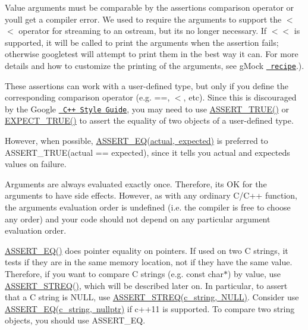 Value arguments must be comparable by the assertion\textquotesingle{}s comparison operator or you\textquotesingle{}ll get a compiler error. We used to require the arguments to support the {\ttfamily $<$$<$} operator for streaming to an {\ttfamily ostream}, but it\textquotesingle{}s no longer necessary. If {\ttfamily $<$$<$} is supported, it will be called to print the arguments when the assertion fails; otherwise googletest will attempt to print them in the best way it can. For more details and how to customize the printing of the arguments, see g\+Mock \href{../../googlemock/docs/CookBook.md\#teaching-google-mock-how-to-print-your-values}{\texttt{ recipe}}.).

These assertions can work with a user-\/defined type, but only if you define the corresponding comparison operator (e.\+g. {\ttfamily ==}, {\ttfamily $<$}, etc). Since this is discouraged by the Google \href{https://google.github.io/styleguide/cppguide.html\#Operator_Overloading}{\texttt{ C++ Style Guide}}, you may need to use {\ttfamily \mbox{\hyperlink{gtest_8h_ae9244bfbda562e8b798789b001993fa5}{A\+S\+S\+E\+R\+T\+\_\+\+T\+R\+U\+E()}}} or {\ttfamily \mbox{\hyperlink{gtest_8h_ac33e7cdfb5d44a7a0f0ab552eb5c3c6a}{E\+X\+P\+E\+C\+T\+\_\+\+T\+R\+U\+E()}}} to assert the equality of two objects of a user-\/defined type.

However, when possible, {\ttfamily \mbox{\hyperlink{gtest_8h_a1a6db8b1338ee7040329322b77779086}{A\+S\+S\+E\+R\+T\+\_\+\+E\+Q(actual, expected)}}} is preferred to {\ttfamily A\+S\+S\+E\+R\+T\+\_\+\+T\+R\+UE(actual == expected)}, since it tells you {\ttfamily actual} and {\ttfamily expected}\textquotesingle{}s values on failure.

Arguments are always evaluated exactly once. Therefore, it\textquotesingle{}s OK for the arguments to have side effects. However, as with any ordinary C/\+C++ function, the arguments\textquotesingle{} evaluation order is undefined (i.\+e. the compiler is free to choose any order) and your code should not depend on any particular argument evaluation order.

{\ttfamily \mbox{\hyperlink{gtest_8h_a1a6db8b1338ee7040329322b77779086}{A\+S\+S\+E\+R\+T\+\_\+\+E\+Q()}}} does pointer equality on pointers. If used on two C strings, it tests if they are in the same memory location, not if they have the same value. Therefore, if you want to compare C strings (e.\+g. {\ttfamily const char$\ast$}) by value, use {\ttfamily \mbox{\hyperlink{gtest_8h_a74f4189ea570bab9a65d47104659ef9c}{A\+S\+S\+E\+R\+T\+\_\+\+S\+T\+R\+E\+Q()}}}, which will be described later on. In particular, to assert that a C string is {\ttfamily N\+U\+LL}, use {\ttfamily \mbox{\hyperlink{gtest_8h_a74f4189ea570bab9a65d47104659ef9c}{A\+S\+S\+E\+R\+T\+\_\+\+S\+T\+R\+E\+Q(c\+\_\+string, N\+U\+L\+L)}}}. Consider use {\ttfamily \mbox{\hyperlink{gtest_8h_a1a6db8b1338ee7040329322b77779086}{A\+S\+S\+E\+R\+T\+\_\+\+E\+Q(c\+\_\+string, nullptr)}}} if c++11 is supported. To compare two {\ttfamily string} objects, you should use {\ttfamily A\+S\+S\+E\+R\+T\+\_\+\+EQ}.

